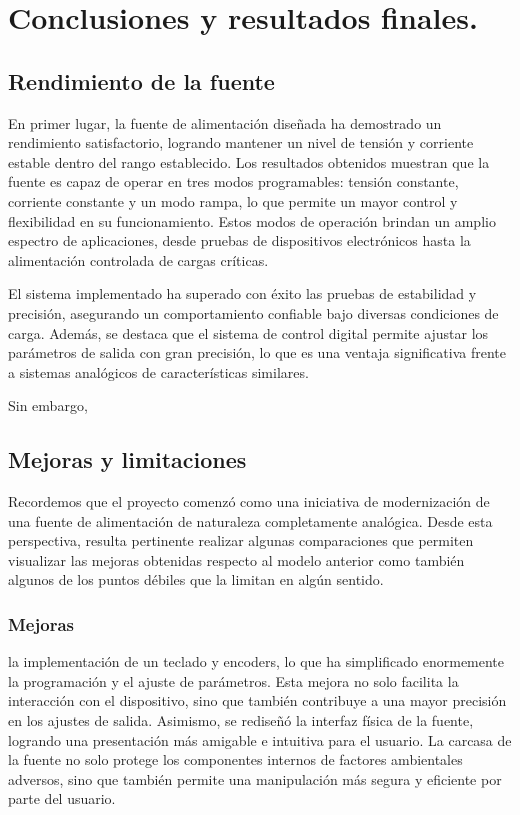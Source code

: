 \chapter{Conclusiones y resultados finales.}

\label{C:Conclusiones y resultados finales.}

\section{Rendimiento de la fuente} 
En primer lugar, la fuente de alimentación diseñada ha demostrado un rendimiento satisfactorio, logrando mantener un nivel de tensión y corriente estable dentro del rango establecido. Los resultados obtenidos muestran que la fuente es capaz de operar en tres modos programables: tensión constante, corriente constante y un modo rampa, lo que permite un mayor control y flexibilidad en su funcionamiento. Estos modos de operación brindan un amplio espectro de aplicaciones, desde pruebas de dispositivos electrónicos hasta la alimentación controlada de cargas críticas.\par
El sistema implementado ha superado con éxito las pruebas de estabilidad y precisión, asegurando un comportamiento confiable bajo diversas condiciones de carga. Además, se destaca que el sistema de control digital permite ajustar los parámetros de salida con gran precisión, lo que es una ventaja significativa frente a sistemas analógicos de características similares.\par
Sin embargo,

\section{Mejoras y limitaciones} 
Recordemos que el proyecto comenzó como una iniciativa de modernización de una fuente de alimentación de naturaleza completamente analógica. Desde esta perspectiva, resulta pertinente realizar algunas comparaciones que permiten visualizar las mejoras obtenidas respecto al modelo anterior como también algunos de los puntos débiles que la limitan en algún sentido.\par

\subsection{Mejoras} 
la implementación de un teclado y encoders, lo que ha simplificado enormemente la programación y el ajuste de parámetros. Esta mejora no solo facilita la interacción con el dispositivo, sino que también contribuye a una mayor precisión en los ajustes de salida. 
Asimismo, se rediseñó la interfaz física de la fuente, logrando una presentación más amigable e intuitiva para el usuario. 
La carcasa de la fuente no solo protege los componentes internos de factores ambientales adversos, sino que también permite una manipulación más segura y eficiente por parte del usuario.\par

